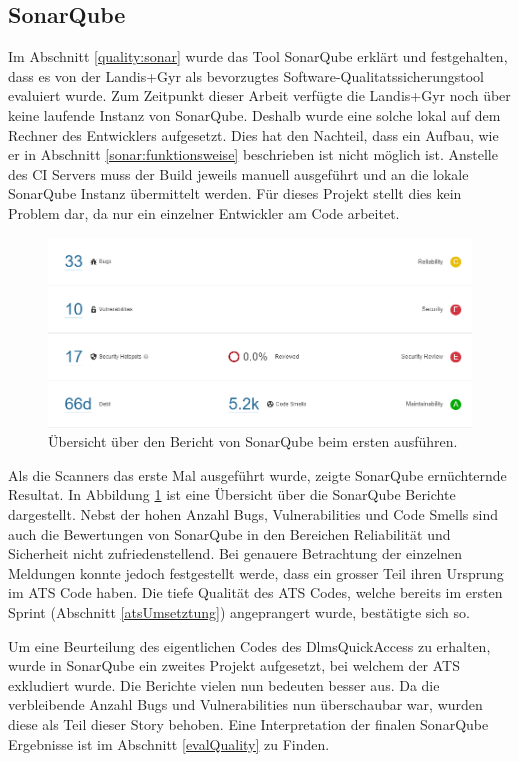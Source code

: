 \subsection{SonarQube}\label{s6:sonar}
Im Abschnitt \ref{quality:sonar} wurde das Tool SonarQube erklärt und festgehalten, dass es von der Landis+Gyr als bevorzugtes Software-Qualitatssicherungstool evaluiert wurde.
Zum Zeitpunkt dieser Arbeit verfügte die Landis+Gyr noch über keine laufende Instanz von SonarQube.
Deshalb wurde eine solche lokal auf dem Rechner des Entwicklers aufgesetzt.
Dies hat den Nachteil, dass ein Aufbau, wie er in Abschnitt \ref{sonar:funktionsweise} beschrieben ist nicht möglich ist.
Anstelle des \ac{CI} Servers muss der Build jeweils manuell ausgeführt und an die lokale SonarQube Instanz übermittelt werden.
Für dieses Projekt stellt dies kein Problem dar, da nur ein einzelner Entwickler am Code arbeitet.

\begin{figure}[H]
   \centering
   \includegraphics[width=1.0\textwidth]{gfx/SonarQubeOverallWithATS.png}
   \caption{
      Übersicht über den Bericht von SonarQube beim ersten ausführen.
   }
   \label{fig:sonarFistRunWithAts}
\end{figure}

Als die Scanners das erste Mal ausgeführt wurde, zeigte SonarQube ernüchternde Resultat.
In Abbildung \ref{fig:sonarFistRunWithAts} ist eine Übersicht über die SonarQube Berichte dargestellt.
Nebst der hohen Anzahl Bugs, Vulnerabilities und Code Smells sind auch die Bewertungen von SonarQube in den Bereichen Reliabilität und Sicherheit nicht zufriedenstellend.
Bei genauere Betrachtung der einzelnen Meldungen konnte jedoch festgestellt werde, dass ein grosser Teil ihren Ursprung im \ac{ATS} Code haben.
Die tiefe Qualität des \ac{ATS} Codes, welche bereits im ersten Sprint (Abschnitt \ref{atsUmsetztung}) angeprangert wurde, bestätigte sich so.

Um eine Beurteilung des eigentlichen Codes des DlmsQuickAccess zu erhalten, wurde in SonarQube ein zweites Projekt aufgesetzt, bei welchem der \ac{ATS} exkludiert wurde.
Die Berichte vielen nun bedeuten besser aus.
Da die verbleibende Anzahl Bugs und Vulnerabilities nun überschaubar war, wurden diese als Teil dieser Story behoben.
Eine Interpretation der finalen SonarQube Ergebnisse ist im Abschnitt \ref{evalQuality} zu Finden.


